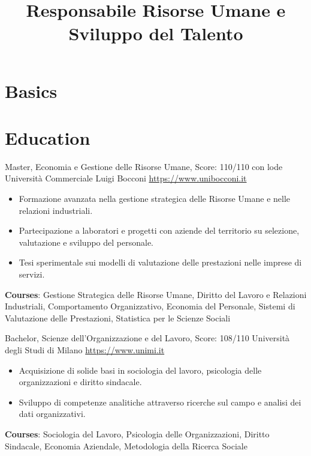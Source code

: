 \documentclass[a4paper, serif, 10pt]{moderncv}
\title{Responsabile Risorse Umane e Sviluppo del Talento}
\begin{document}
\maketitle

\section{Basics}

\section{Education}

        {Master, Economia e Gestione delle Risorse Umane, Score: 110/110 con lode}
        {Università Commerciale Luigi Bocconi}
        {\url{https://www.unibocconi.it}}
        {}
        {\begin{itemize}
\item Formazione avanzata nella gestione strategica delle Risorse Umane e nelle relazioni industriali.
\item Partecipazione a laboratori e progetti con aziende del territorio su selezione, valutazione e sviluppo del personale.
\item Tesi sperimentale sui modelli di valutazione delle prestazioni nelle imprese di servizi.
\end{itemize}
\textbf{Courses}: Gestione Strategica delle Risorse Umane, Diritto del Lavoro e Relazioni Industriali, Comportamento Organizzativo, Economia del Personale, Sistemi di Valutazione delle Prestazioni, Statistica per le Scienze Sociali}

        {Bachelor, Scienze dell'Organizzazione e del Lavoro, Score: 108/110}
        {Università degli Studi di Milano}
        {\url{https://www.unimi.it}}
        {}
        {\begin{itemize}
\item Acquisizione di solide basi in sociologia del lavoro, psicologia delle organizzazioni e diritto sindacale.
\item Sviluppo di competenze analitiche attraverso ricerche sul campo e analisi dei dati organizzativi.
\end{itemize}
\textbf{Courses}: Sociologia del Lavoro, Psicologia delle Organizzazioni, Diritto Sindacale, Economia Aziendale, Metodologia della Ricerca Sociale}
\end{document}
